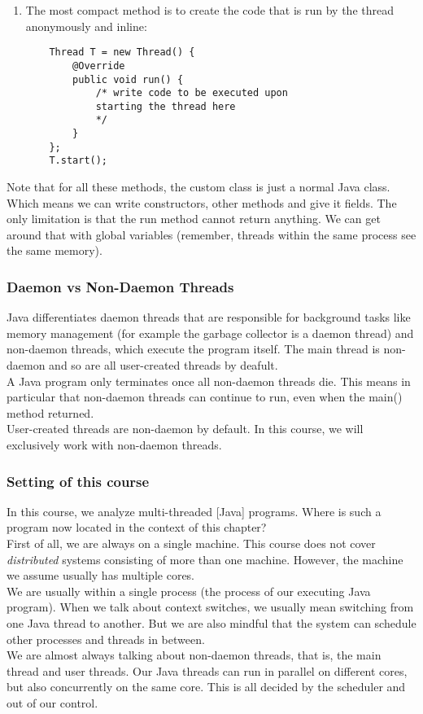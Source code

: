 \documentclass[main]{subfiles}
\begin{document}
\begin{enumerate}
    \item The most compact method is to create the code that is run by the thread anonymously and inline:
    \begin{verbatim}
    Thread T = new Thread() {
        @Override
        public void run() {
            /* write code to be executed upon
            starting the thread here
            */
        }
    };
    T.start();
    \end{verbatim}
\end{enumerate}
Note that for all these methods, the custom class is just a normal Java class. Which means we can write constructors, other methods and give it fields. The only limitation is that the run method cannot return anything. We can get around that with global variables (remember, threads within the same process see the same memory).

\subsubsection{Daemon vs Non-Daemon Threads}
Java differentiates daemon threads that are responsible for background tasks like memory management (for example the garbage collector is a daemon thread) and non-daemon threads, which execute the program itself. The main thread is non-daemon and so are all user-created threads by deafult.\\
A Java program only terminates once all non-daemon threads die. This means in particular that non-daemon threads can continue to run, even when the main() method returned.\\
User-created threads are non-daemon by default. In this course, we will exclusively work with non-daemon threads.

\subsubsection{Setting of this course}
In this course, we analyze multi-threaded [Java] programs. Where is such a program now located in the context of this chapter?\\
First of all, we are always on a single machine. This course does not cover \textit{distributed} systems consisting of more than one machine. However, the machine we assume usually has multiple cores.\\
We are usually within a single process (the process of our executing Java program). When we talk about context switches, we usually mean switching from one Java thread to another. But we are also mindful that the system can schedule other processes and threads in between.\\
We are almost always talking about non-daemon threads, that is, the main thread and user threads. Our Java threads can run in parallel on different cores, but also concurrently on the same core. This is all decided by the scheduler and out of our control.
\end{document}
